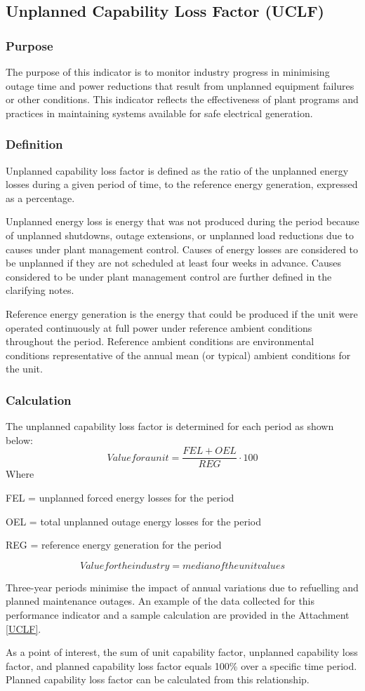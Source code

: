 \subsection{Unplanned Capability Loss Factor (UCLF)}

\subsubsection{Purpose}

The purpose of this indicator is to monitor industry progress in
minimising outage time and power reductions that result from unplanned
equipment failures or other conditions. This indicator reflects the
effectiveness of plant programs and practices in maintaining systems
available for safe electrical generation.

\subsubsection{Definition}
Unplanned capability loss factor is defined as the ratio of the
unplanned energy losses during a given period of time, to the
reference energy generation, expressed as a percentage.

Unplanned energy loss is energy that was not produced during the
period because of unplanned shutdowns, outage extensions, or unplanned
load reductions due to causes under plant management control. Causes
of energy losses are considered to be unplanned if they are not
scheduled at least four weeks in advance. Causes considered to be
under plant management control are further defined in the clarifying
notes.

Reference energy generation is the energy that could be produced if
the unit were operated continuously at full power under reference
ambient conditions throughout the period. Reference ambient conditions
are environmental conditions representative of the annual mean (or
typical) ambient conditions for the unit.

\subsubsection{Calculation}
The unplanned capability loss factor is determined for each period as shown below:
$$ Value for a unit  =  \frac{FEL+OEL}{REG} \cdot 100 $$
Where

FEL  = unplanned forced energy losses for the period

OEL = total unplanned outage energy losses for the period

REG = reference energy generation for the period

$$ Value for the industry  = median of the unit values $$

Three-year periods minimise the impact of annual variations due to
refuelling and planned maintenance outages. An example of the data
collected for this performance indicator and a sample calculation are
provided in the Attachment \ref{UCLF}.

As a point of interest, the sum of unit capability factor, unplanned capability loss factor, and planned capability loss factor equals 100\% over a specific time period. Planned capability loss factor can be calculated from this relationship.

